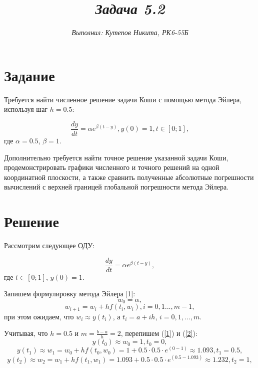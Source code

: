 \documentclass[12pt,a4paper]{article}
\author{\textit{Выполнил: Кутепов Никита, РК6-55Б}}
\title{\textit{Задача 5.2}}
\date{}
\begin{document}
\maketitle

\newpage
\section*{Задание}
Требуется найти численное решение задачи Коши с помощью метода Эйлера, используя шаг $h = 0.5$:

\begin{equation*}
	\frac{dy}{dt} = \alpha e^{\beta (t-y)},
	y(0) = 1, 
	t \in [0;1],
\end{equation*}
где $\alpha = 0.5$, $\beta = 1$.

Дополнительно требуется найти точное решение указанной задачи Коши, продемонстрировать графики численного и точного решений на одной координатной плоскости, а также сравнить полученные абсолютные погрешности вычислений с верхней границей глобальной погрешности метода Эйлера.
\section*{Решение}

Рассмотрим следующее ОДУ:

\begin{equation}
	\frac{dy}{dt} = \alpha e^{\beta (t-y)},
\end{equation}
где $t \in [0;1]$, $y(0) = 1$.

Запишем формулировку метода Эйлера [1]:
\begin{equation}\label{1}
	w_0 = \alpha,
\end{equation}
\begin{equation}\label{2}
	w_{i+1} = w_i + h  f(t_i, w_i), 
	i = 0,1...,m-1,
\end{equation}
при этом ожидаем, что $w_i \approx y(t_i)$, а $t_i = a + ih$, $i = 0,1,...,m$.

Учитывая, что $h = 0.5$ и $m = \frac{b - a}{h} = 2$, перепишем (\ref{1}) и (\ref{2}):
\begin{equation}\label{3}
	y(t_0) \approx w_0 = 1, t_0 = 0,
\end{equation}
\begin{equation}\label{3}
	y(t_1) \approx w_1 = w_0 + hf(t_0, w_0) = 1 + 0.5 \cdot 0.5 \cdot e^{(0 - 1)} \approx 1.093, t_1 = 0.5,
\end{equation}
\begin{equation}\label{3}
	y(t_2) \approx w_2 = w_1 + hf(t_1, w_1) = 1.093 + 0.5 \cdot 0.5 \cdot e^{(0.5 - 1.093)} \approx 1.232, t_2 = 1,
\end{equation}
\end{document}
